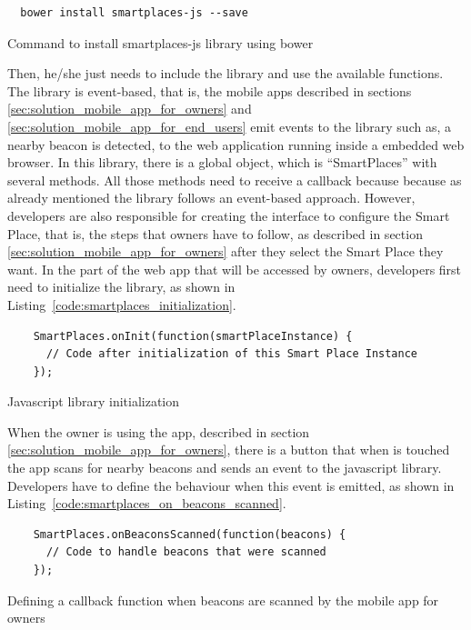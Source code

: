 \begin{listing}[H]
  \begin{verbatim}
  bower install smartplaces-js --save
  \end{verbatim}
  \caption[Library installation using Bower]{Command to install smartplaces-js library using bower}
  \label{code:bower_install}
\end{listing}
Then, he/she just needs to include the library and use the available functions.
The library is event-based, that is, the mobile apps described in sections \ref{sec:solution_mobile_app_for_owners} and \ref{sec:solution_mobile_app_for_end_users} emit events to the library such as, a nearby beacon is detected, to the web application running inside a embedded web browser.
In this library, there is a global object, which is ``SmartPlaces'' with several methods.
All those methods need to receive a callback because because as already mentioned the library follows an event-based approach.
However, developers are also responsible for creating the interface to configure the Smart Place, that is, the steps that owners have to follow, as described in section \ref{sec:solution_mobile_app_for_owners} after they select the Smart Place they want.
In the part of the web app that will be accessed by owners, developers first need to initialize the library, as shown in Listing~\ref{code:smartplaces_initialization}.
\begin{listing}[H]
  \begin{verbatim}
    SmartPlaces.onInit(function(smartPlaceInstance) {
      // Code after initialization of this Smart Place Instance
    });
  \end{verbatim}
  \caption[Javascript library initialization]{Javascript library initialization}
  \label{code:smartplaces_initialization}
\end{listing}

When the owner is using the app, described in section \ref{sec:solution_mobile_app_for_owners}, there is a button that when is touched the app scans for nearby beacons and sends an event to the javascript library.
Developers have to define the behaviour when this event is emitted, as shown in
Listing~\ref{code:smartplaces_on_beacons_scanned}.

\begin{listing}[H]
  \begin{verbatim}
    SmartPlaces.onBeaconsScanned(function(beacons) {
      // Code to handle beacons that were scanned
    });
  \end{verbatim}
  \caption[Beacons scanned]{Defining a callback function when beacons are scanned by the mobile app for owners}
  \label{code:smartplaces_on_beacons_scanned}
\end{listing}

